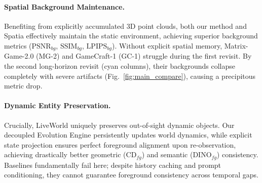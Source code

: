 
\paragraph{Spatial Background Maintenance.}
Benefiting from explicitly accumulated 3D point clouds, both our method and Spatia effectively maintain the static environment, achieving superior background metrics ($\text{PSNR}_{bg}$, $\text{SSIM}_{bg}$, $\text{LPIPS}_{bg}$). Without explicit spatial memory, Matrix-Game-2.0 (MG-2) and GameCraft-1 (GC-1) struggle during the first revisit. By the second long-horizon revisit (cyan columns), their backgrounds collapse completely with severe artifacts (Fig.~\ref{fig:main_compare}), causing a precipitous metric drop.
\vspace{-1mm}

\paragraph{Dynamic Entity Preservation.}
Crucially, LiveWorld uniquely preserves out-of-sight dynamic objects. Our decoupled Evolution Engine persistently updates world dynamics, while explicit state projection ensures perfect foreground alignment upon re-observation, achieving drastically better geometric ($\text{CD}_{fg}$) and semantic ($\text{DINO}_{fg}$) consistency. Baselines fundamentally fail here; despite history caching and prompt conditioning, they cannot guarantee foreground consistency across temporal gaps.
\vspace{-1mm}

